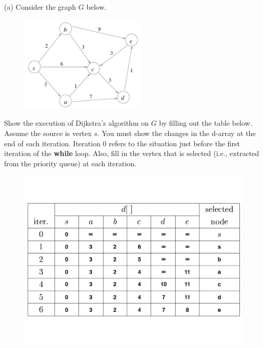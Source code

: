 \documentclass[11pt]{amsart}
\begin{document}
(a) Consider the graph $G$ below.
\begin{figure}[htb]
\begin{center}
\includegraphics[width=6cm]{SP}
\end{center}
\end{figure}

Show the execution of Dijkstra's algorithm on $G$ by filling out the table below. Assume the source is vertex $s$. You must show the changes in the
d-array at the end of each iteration. Iteration 0 refers to the situation just before the first  iteration of the {\bf while} loop. Also, fill in the vertex that is selected (i.e., extracted from the priority queue) at each iteration.
\begin{figure}[htb]
\begin{center}
\includegraphics[width=12cm]{SPa.pdf}
\end{center}
\end{figure}

\newpage
\hrulefill \\
\end{document}
